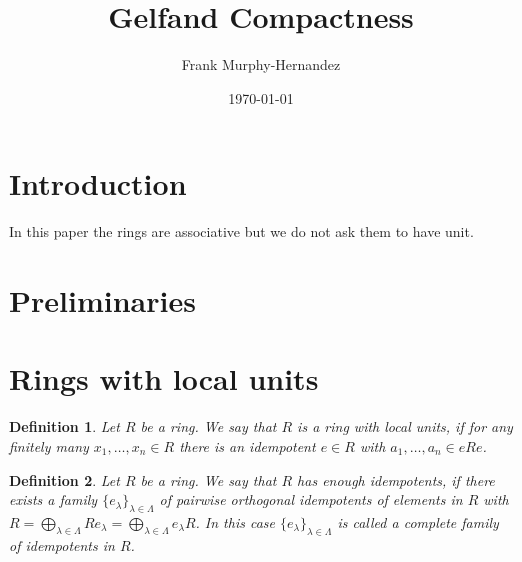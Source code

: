 \documentclass{amsart}
\newtheorem{definition}{Definition}[section]
\begin{document}
\title{Gelfand Compactness}

\author{Frank Murphy-Hernandez}
\address{Facultad de Ciencias, UNAM, Mexico City}


\date{\today}

\keywords{,,}

\begin{abstract}

\end{abstract}

\maketitle

\section*{Introduction}

In this paper the rings are associative but we do not ask them to have unit.



\section{Preliminaries}

\cite{wisbauer2018foundations}


\section{Rings with local units}

\begin{definition}
Let $R$ be a ring. We say that $R$ is a ring with local units, if for any finitely many $x_1,\dots,x_n\in R$ there is an idempotent $e\in R$ with $a_1,\dots,a_n\in eRe$.
\end{definition}

\begin{definition}
Let $R$ be a ring. We say that $R$ has enough idempotents, if there exists a family $\{e_\lambda\}_{\lambda\in\Lambda}$ of pairwise orthogonal idempotents of elements in $R$ with $R=\bigoplus_{\lambda\in\Lambda}Re_\lambda=\bigoplus_{\lambda\in\Lambda}e_\lambda R$. In this case $\{e_\lambda\}_{\lambda\in\Lambda}$ is called a complete family of idempotents in $R$. 
\end{definition}
\end{document}
